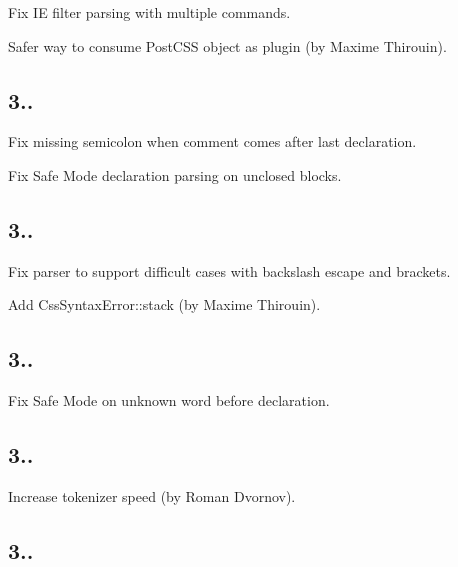 \begin{DoxyItemize}
\item Fix IE filter parsing with multiple commands.
\item Safer way to consume Post\+C\+SS object as plugin (by Maxime Thirouin).
\end{DoxyItemize}

\subsection*{3..}


\begin{DoxyItemize}
\item Fix missing semicolon when comment comes after last declaration.
\item Fix Safe Mode declaration parsing on unclosed blocks.
\end{DoxyItemize}

\subsection*{3..}


\begin{DoxyItemize}
\item Fix parser to support difficult cases with backslash escape and brackets.
\item Add {\ttfamily Css\+Syntax\+Error\+::stack} (by Maxime Thirouin).
\end{DoxyItemize}

\subsection*{3..}


\begin{DoxyItemize}
\item Fix Safe Mode on unknown word before declaration.
\end{DoxyItemize}

\subsection*{3..}


\begin{DoxyItemize}
\item Increase tokenizer speed (by Roman Dvornov).
\end{DoxyItemize}

\subsection*{3..}


